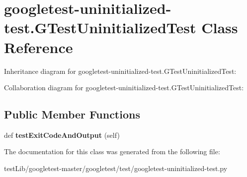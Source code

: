 \hypertarget{classgoogletest-uninitialized-test_1_1GTestUninitializedTest}{}\section{googletest-\/uninitialized-\/test.G\+Test\+Uninitialized\+Test Class Reference}
\label{classgoogletest-uninitialized-test_1_1GTestUninitializedTest}


Inheritance diagram for googletest-\/uninitialized-\/test.G\+Test\+Uninitialized\+Test\+:


Collaboration diagram for googletest-\/uninitialized-\/test.G\+Test\+Uninitialized\+Test\+:
\subsection*{Public Member Functions}
\begin{DoxyCompactItemize}
\item 
\mbox{\label{classgoogletest-uninitialized-test_1_1GTestUninitializedTest_aa3c5445f3d94a94d9b252fd64f05e4a0}} 
def {\bfseries test\+Exit\+Code\+And\+Output} (self)
\end{DoxyCompactItemize}


The documentation for this class was generated from the following file\+:\begin{DoxyCompactItemize}
\item 
test\+Lib/googletest-\/master/googletest/test/googletest-\/uninitialized-\/test.\+py\end{DoxyCompactItemize}
